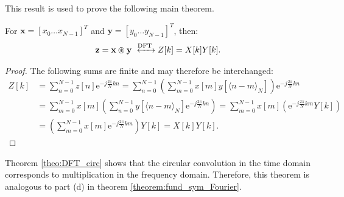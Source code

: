 This result is used to prove the following main theorem.

\begin{theorem} \label{theo:DFT_circ}
For $\textbf{x} = [x_0 \dots x_{N-1}]^T$ and $\textbf{y} = [y_0 \dots y_{N-1}]^T$, then:
\begin{align*}
\textbf{z} = \textbf{x} \circledast \textbf{y} \xleftrightarrow{\text{DFT}} Z[k] = X[k] Y[k].
\end{align*}
\end{theorem}

\begin{proof}
The following sums are finite and may therefore be interchanged:
\begin{align*}
Z[k] &= \sum_{n=0}^{N-1} z[n] \text{e}^{-j\frac{2\pi}{N}kn} = \sum_{n=0}^{N-1} \left( \sum_{m=0}^{N-1} x[m] y[\langle n-m\rangle_N] \right) \text{e}^{-j\frac{2\pi}{N}kn} \\
&= \sum_{m=0}^{N-1} x[m] \left( \sum_{n=0}^{N-1} y[\langle n-m\rangle_N]\text{e}^{-j\frac{2\pi}{N}kn} \right) = \sum_{m=0}^{N-1} x[m] \left( \text{e}^{-j\frac{2\pi}{N}km}Y[k] \right) \\
&= \left( \sum_{m=0}^{N-1} x[m] \text{e}^{-j\frac{2\pi}{N}km} \right)Y[k] = X[k] Y[k].
\end{align*}
\end{proof}

Theorem \ref{theo:DFT_circ} shows that the circular convolution in the time domain corresponds to multiplication in the frequency domain. Therefore, this theorem is analogous to part (d) in theorem \ref{theorem:fund_sym_Fourier}.

